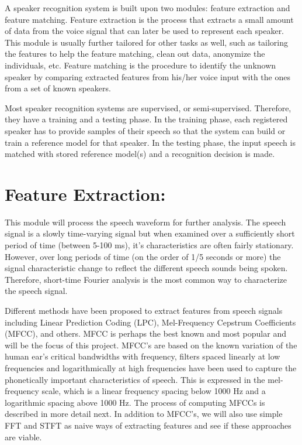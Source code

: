 \documentclass{article}
\begin{document}
A speaker recognition system is built upon two modules: feature extraction and feature matching. Feature extraction is the process that extracts a small amount of data from the voice signal that can later be used to represent each speaker. This module is usually further tailored for other tasks as well, such as tailoring the features to help the feature matching, clean out data, anonymize the individuals, etc. Feature matching is the procedure to identify the unknown speaker by comparing extracted features from his/her voice input with the ones from a set of known speakers. 

Most speaker recognition systems are supervised, or semi-supervised. Therefore, they have a training and a testing phase. In the training phase, each registered speaker has to provide samples of their speech so that the system can build or train a reference model for that speaker. In the testing phase, the input speech is matched with stored reference model(s) and a recognition decision is made.

\section{Feature Extraction:}
This module will process the speech waveform for further analysis. The speech signal is a slowly time-varying signal but when examined over a sufficiently short period of time (between 5-100 ms), it's characteristics are often fairly stationary. However, over long periods of time (on the order of 1/5 seconds or more) the signal characteristic change to reflect the different speech sounds being spoken. Therefore, short-time Fourier analysis is the most common way to characterize the speech signal.

Different methods have been proposed to extract features from speech signals including Linear Prediction Coding (LPC), Mel-Frequency Cepstrum Coefficients (MFCC), and others.  MFCC is perhaps the best known and most popular and will be the focus of this project. MFCC's are based on the known variation of the human ear's critical bandwidths with frequency, filters spaced linearly at low frequencies and logarithmically at high frequencies have been used to capture the phonetically important characteristics of speech.  This is expressed in the mel-frequency scale, which is a linear frequency spacing below 1000 Hz and a logarithmic spacing above 1000 Hz.  The process of computing MFCCs is described in more detail next. In addition to MFCC's, we will also use simple FFT and STFT as naive ways of extracting features and see if these approaches are viable.
\end{document}
